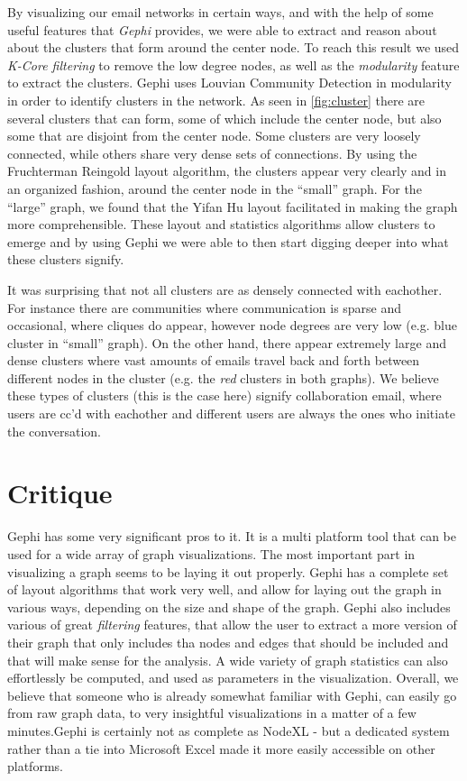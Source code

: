 \documentclass[11pt,letterpaper]{article}
\begin{document}
By visualizing our email networks in certain ways, and with the help of some useful features that \textit{Gephi} provides, we were able to extract and reason about about the clusters that form around the center node. To reach this result we used \textit{K-Core filtering} to remove the low degree nodes, as well as the \textit{modularity} feature to extract the clusters. Gephi uses Louvian Community Detection \cite{de_meo_generalized_2011} in modularity in order to identify clusters in the network. As seen in \ref{fig:cluster} there are several clusters that can form, some of which include the center node, but also some that are disjoint from the center node. Some clusters are very loosely connected, while others share very dense sets of connections. By using the Fruchterman Reingold \cite{fruchterman_graph_1991} layout algorithm, the clusters appear very clearly and in an organized fashion, around the center node in the ``small'' graph. For the ``large'' graph, we found that the Yifan Hu \cite{hu_efficient_2005} layout facilitated in making the graph more comprehensible. These layout and statistics algorithms allow clusters to emerge and by using Gephi we were able to then start digging deeper into what these clusters signify.

It was surprising that not all clusters are as densely connected with eachother. For instance there are communities where communication is sparse and occasional, where cliques do appear, however node degrees are very low (e.g. blue cluster in ``small'' graph). On the other hand, there appear extremely large and dense clusters where vast amounts of emails travel back and forth between different nodes in the cluster (e.g. the \textit{red} clusters in both graphs). We believe these types of clusters (this is the case here) signify collaboration email, where users are cc'd with eachother and different users are always the ones who initiate the conversation.

\section*{Critique}

Gephi has some very significant pros to it. It is a multi platform tool that can be used for a wide array of graph visualizations. The most important part in visualizing a graph seems to be laying it out properly. Gephi has a complete set of layout algorithms that work very well, and allow for laying out the graph in various ways, depending on the size and shape of the graph. Gephi also includes various of great \textit{filtering} features, that allow the user to extract a more version of their graph that only includes tha nodes and edges that should be included and that will make sense for the analysis. A wide variety of graph statistics can also effortlessly be computed, and used as parameters in the visualization. Overall, we believe that someone who is already somewhat familiar with Gephi, can easily go from raw graph data, to very insightful visualizations in a matter of a few minutes.Gephi is certainly not as complete as NodeXL - but a dedicated system rather than a tie into Microsoft Excel made it more easily accessible on other platforms.
\end{document}

